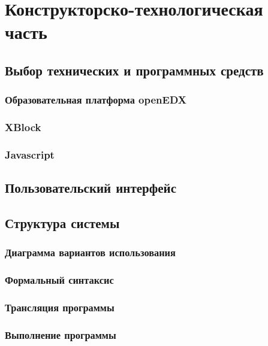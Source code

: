\chapter{Конструкторско-технологическая часть}

\section{Выбор технических и программных средств}
\subsection{Образовательная платформа openEDX}
\subsection{XBlock}
\subsection{Javascript}
\section{Пользовательский интерфейс}
\section{Структура системы}
\subsection{Диаграмма вариантов использования}
\subsection{Формальный синтаксис}
\subsection{Трансляция программы}
\subsection{Выполнение программы}

